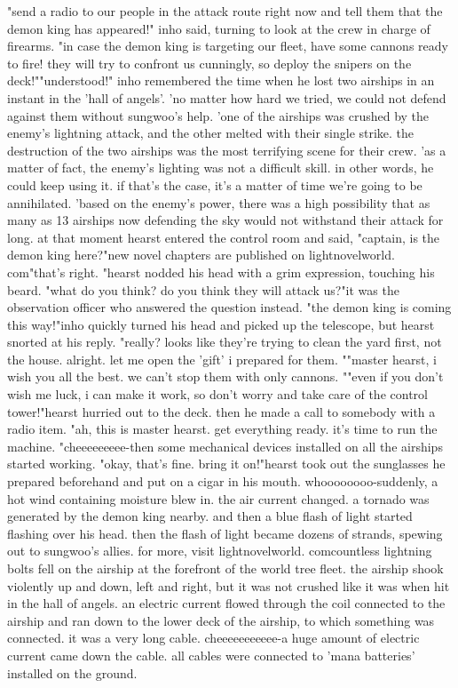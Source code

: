 "send a radio to our people in the attack route right now and tell them that the demon king has appeared!" inho said, turning to look at the crew in charge of firearms.
 "in case the demon king is targeting our fleet, have some cannons ready to fire! they will try to confront us cunningly, so deploy the snipers on the deck!""understood!"
inho remembered the time when he lost two airships in an instant in the 'hall of angels'.
'no matter how hard we tried, we could not defend against them without sungwoo's help.
'one of the airships was crushed by the enemy's lightning attack, and the other melted with their single strike.
 the destruction of the two airships was the most terrifying scene for their crew.
 'as a matter of fact, the enemy's lighting was not a difficult skill.
 in other words, he could keep using it.
 if that's the case, it's a matter of time we're going to be annihilated.
'based on the enemy's power, there was a high possibility that as many as 13 airships now defending the sky would not withstand their attack for long.
 at that moment hearst entered the control room and said, "captain, is the demon king here?"new novel chapters are published on lightnovelworld.
com"that's right.
"hearst nodded his head with a grim expression, touching his beard.
"what do you think? do you think they will attack us?"it was the observation officer who answered the question instead.
"the demon king is coming this way!"inho quickly turned his head and picked up the telescope, but hearst snorted at his reply.
 "really? looks like they're trying to clean the yard first, not the house.
 alright.
 let me open the 'gift' i prepared for them.
""master hearst, i wish you all the best.
 we can't stop them with only cannons.
""even if you don't wish me luck, i can make it work, so don't worry and take care of the control tower!"hearst hurried out to the deck.
 then he made a call to somebody with a radio item.
"ah, this is master hearst.
 get everything ready.
 it's time to run the machine.
"cheeeeeeeee-then some mechanical devices installed on all the airships started working.
"okay, that's fine.
 bring it on!"hearst took out the sunglasses he prepared beforehand and put on a cigar in his mouth.
whoooooooo-suddenly, a hot wind containing moisture blew in.
 the air current changed.
 a tornado was generated by the demon king nearby.
 and then a blue flash of light started flashing over his head.
then the flash of light became dozens of strands, spewing out to sungwoo's allies.
 for more, visit lightnovelworld.
comcountless lightning bolts fell on the airship at the forefront of the world tree fleet.
the airship shook violently up and down, left and right, but it was not crushed like it was when hit in the hall of angels.
an electric current flowed through the coil connected to the airship and ran down to the lower deck of the airship, to which something was connected.
 it was a very long cable.
cheeeeeeeeeee-a huge amount of electric current came down the cable.
 all cables were connected to 'mana batteries' installed on the ground.


